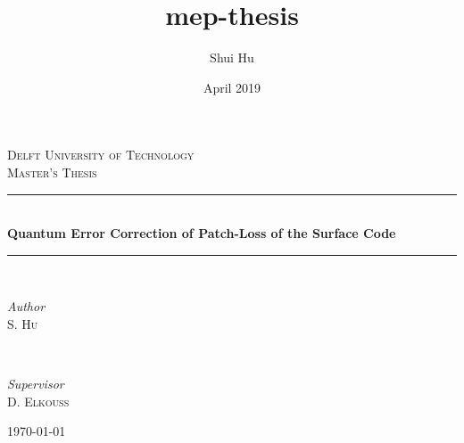 \documentclass[titlepage]{report}
\title{mep-thesis}
\author{Shui Hu}
\date{April 2019}
\begin{document}
\begin{titlepage}
	\newcommand{\HRule}{\rule{\linewidth}{0.3mm}}
	\center

	\textsc{\Large Delft University of Technology}\\[1.5cm]

	\textsc{\large Master's Thesis}\\[0.5cm]

    \vfill

	\HRule\\[1cm]

	{\huge\bfseries Quantum Error Correction of Patch-Loss of the Surface Code}\\[0.4cm]

	\HRule\\[1.8cm]

	\begin{minipage}{0.4\textwidth}
		\begin{flushleft}
			\large
			\textit{Author}\\
			S. \textsc{Hu}
		\end{flushleft}
	\end{minipage}
	~
	\begin{minipage}{0.4\textwidth}
		\begin{flushright}
			\large
			\textit{Supervisor}\\
			D. \textsc{Elkouss} %
		\end{flushright}
	\end{minipage}



	\vfill\vfill\vfill %

	{\large\today} %
	\vfill %

\end{titlepage}













\end{document}
